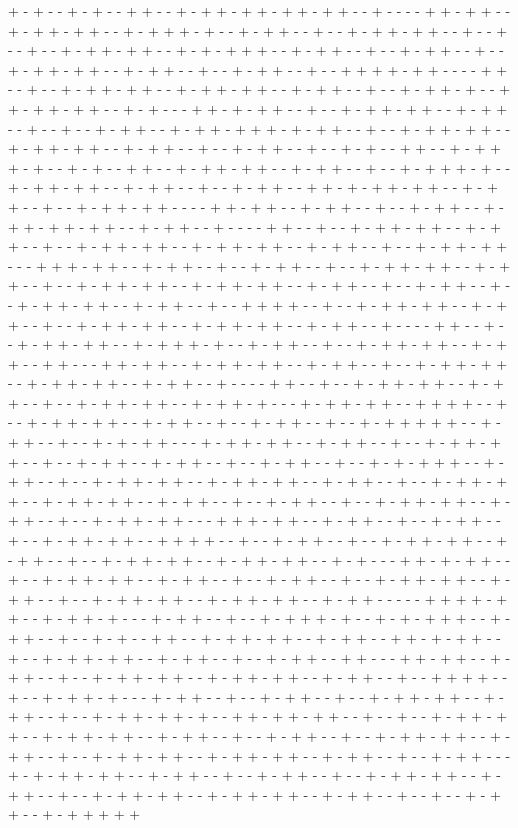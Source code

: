 + - + - - + - + - - + + - - + - + + - + + - + + - + + - - + - - - - + + - + + - - + - + + - + + - - + - + + + - + - - + - + + - - + - - + - + + - + + - - + - - + - - + - - + - + + - + + - - + - + - + + + - - + - + + - - + - - + - + + - - + - - + - + + - + + - - + - + + - - + - - + - + + - - + - - + + + + - + + - - - - + + - - + - - + - + + - + + - - + - + + - + + - - + - + + - - + - - + - + + - + - - + + - + + - + + - - + - + - - - + + - + - + + - - + - - + - + + - + + - - + - + + - - + - - + - - + - + + - - + - + + - + + + - + - + + - - + - - + - + + - + + - - + - + + - + + - - + - + + - - + - - + - + + - - + - - + - + - - + + - - + - + + + - + - - + - + - - + + - - + - + + - + + - - + - + + - - + - - + - + + + - + - - + - + + - + + - - + - + + - - + - - + - + + - - + + - + - + + - + + - - + - + + - - + - - + - + + - + + - - - - + + - + + - - + - + + - - + - - + - + + - - + - + + - + + - + + - - + - + + - - + - - - - + + - - + - - + - + + - + + - - + - + + - - + - - + - + + - + + - - + - + + - + + - - + - + + - - + - - + - + + - + + - - - + + + - + + - - + - + + - - + - - + - + + - - + - - + - + + - + + - - + - + + - - + - - + - + + - + + - - + - + + - + + - - + - + + - - + - - + - + + - - + - - + - + + - + + - - + - + + - - + - - + + + + - - + - - + - + + - + + - - + - + + - - + - - + - + + - + + - - + - + + - + + - - + - + + - - + - - - - + + - - + - - + - + + - + + - - + - + + + - + - - + - + + - - + - - + - + + - + + - - + - + + - - + + - - - + + - + + - - + - + + - + + - - + - + + - - + - - + - + + - + + - - + - + + - + + - - + - + + - - + - - - - + + - - + - - + - + + - + + - - + - + + - - + - - + - + + - + + - - + - + + - + - - - + - + + - + + - - + + + + - - + - - + - + + - + + - - + - + + - - + - - + - + + - - + - - + - + + + + + - - + - + + - - + - - + - + - + + - - - + - + + - + + - - + - + + - - + - - + - + + - + + - - + - - + - + + - - + - + + - - + - - + - + + - - + - - + - + - + + + - - + - + + - - + - - + - + + - + + - - + - + + - + + - - + - + + - - + - - + - + + - + + - - + - + + - + + - - + - + + - - + - - + - + + - - + - - + - + + - + + - - + - + + - - + - - + - + + - + + - - - + + + - + + - - + - + + - - + - - + - + + - - + - - + - + + - + + - - + + + + - - + - - + - + + - - + - - + - + + - + + - - + - + + - - + - - + - + + - + + - - + - + + - + + - - + - + - - - + + - + - + + - - + - - + - + + - + + - - + - + + - - + - - + - + + - - + - - + - + + - + + - - + - + + - - + - - + - + + - + + - - + - + + - + + - - + - + + - - - - - + + + + - + + - - + - + + - + - - - + - + + - - + - - + - + + + - + - - + - + - + + + - - + - + + - - + - - + - + - - + + - - + - + + - + + - - + - + + - - + + - + - + + - - + - - + - + + - + + - - + - + + - - + - - + - + + - - + + - - - + + - + + - - + - + + - - + - - + - + + - + + - - + - + + - + + - - + - + + - - + - - + + + + - - + - - + - + + - + - - - + - + + - - + - - + - + + - - + - - + - + + - + + - - + - + + - - + - - + - + + - + + - + - - + + - + + - + + - - + - - + - - + - + + - + + - - + - + + - + + - - + - + + - - + - - + - + + - - + - - + - + + - + + - - + - + + - - + - - + - + + - + + - - + - + + - + + - - + - + + - - + - - + - + + - - - + - + - + + - + + - - + - + + - - + - - + - + + - - + - - + - + + - + + - - + - + + - - + - - + - + + - + + - - + - + + - + + - - + - + + - - + - - + - - + - + + - - + - + + + + + 